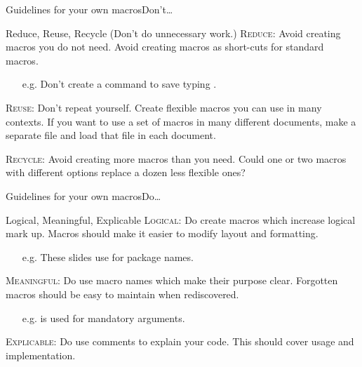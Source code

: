 \begin{frame}{Guidelines for your own macros}{Don't\dots}
  \begin{block}{Reduce, Reuse, Recycle (Don't do unnecessary work.)}
	\onslide<+->
	\lettrine{R}{educe:}
	  Avoid creating macros you do not need.\newline
	  Avoid creating macros as short-cuts for standard macros.
      \begin{itemize}
        \item[e.g.]  Don't create a command  to save typing .
      \end{itemize}

	\onslide<+->
	\lettrine{R}{euse:}
	  Don't repeat yourself.\newline
	  Create flexible macros you can use in many contexts.\newline
	  If you want to use a set of macros in many different documents, make a separate file and load that file in each document.

	\onslide<+->
	\lettrine{R}{ecycle:}
	  Avoid creating more macros than you need.\newline
	  Could one or two macros with different options replace a dozen less flexible ones?
  \end{block}
\end{frame}

\begin{frame}{Guidelines for your own macros}{Do\dots}
  \begin{block}{Logical, Meaningful, Explicable}
	\onslide<+->
	\lettrine{L}{ogical:} Do create macros which increase logical mark up.\newline
	  Macros should make it easier to modify layout and formatting.
	  \begin{itemize}
        \item[e.g.]  These slides use  for package names.
      \end{itemize}

	\onslide<+->
	\lettrine{M}{eaningful:} Do use macro names which make their purpose clear.\newline
	  Forgotten macros should be easy to maintain when rediscovered.
	  \begin{itemize}
        \item[e.g.]   is used for mandatory arguments.
      \end{itemize}

	\onslide<+->
	\lettrine{E}{xplicable:} Do use comments to explain your code.\newline
	  This should cover usage and implementation.
  \end{block}
\end{frame}

